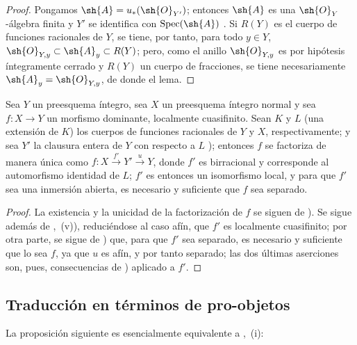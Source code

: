 \begin{proof}
Pongamos $\sh{A}=u_*(\sh{O}_{Y'})$; entonces $\sh{A}$ es una $\sh{O}_Y$-álgebra finita y $Y'$ se identifica con $\operatorname{Spec}(\sh{A})$ .
Si $R(Y)$ es el cuerpo de funciones racionales de $Y$, se tiene, por tanto, para todo $y\in Y$, $\sh{O}_{Y,y}\subset\sh{A}_y\subset R(Y)$; pero, como el anillo $\sh{O}_{Y,y}$ es por hipótesis íntegramente cerrado y $R(Y)$ un cuerpo de fracciones, se tiene necesariamente $\sh{A}_y=\sh{O}_{Y,y}$, de donde el lema.
\end{proof}

\begin{corollary}[8.12.11]
\label{IV.8.12.11}
Sea $Y$ un preesquema íntegro, sea $X$ un preesquema íntegro normal y sea $f:X\to Y$ un morfismo dominante, localmente cuasifinito.
Sean $K$ y $L$ (una extensión de $K$) los cuerpos de funciones racionales de $Y$ y $X$, respectivamente; y sea $Y'$ la clausura entera de $Y$ con respecto a $L$ ); entonces $f$ se factoriza de manera única como $f:X\xrightarrow{f'}Y'\xrightarrow{u}Y$, donde $f'$ es birracional y corresponde al automorfismo identidad de $L$; $f'$ es entonces un isomorfismo local, y para que $f'$ sea una inmersión abierta, es necesario y suficiente que $f$ sea separado.
\end{corollary}

\begin{proof}
La existencia y la unicidad de la factorización de $f$ se siguen de ).
Se sigue además de ,~(v)), reduciéndose al caso afín, que $f'$ es localmente cuasifinito; por otra parte, se sigue de ) que, para que $f'$ sea separado, es necesario y suficiente que lo sea $f$, ya que $u$ es afín, y por tanto separado; las dos últimas aserciones son, pues, consecuencias de ) aplicado a $f'$.
\end{proof}


\subsection{Traducción en términos de pro-objetos}
\label{subsection:IV.8.13}

La proposición siguiente es esencialmente equivalente a ,~(i):

